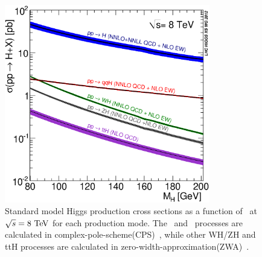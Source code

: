 \begin{figure}[t]
\centering
\includegraphics[width=0.8\textwidth]{figures/Higgs_XS_8TeV_LM200.eps}
\caption{ Standard model Higgs production cross sections 
as a function of \mHi\ at $\sqrt{s}=8~\mathrm{Te\kern -0.1em V}$ for each 
production mode. %
The \ggH\ and \qqH\ processes are 
calculated in complex-pole-scheme(CPS)~\cite{Goria:2011wa}, while other WH/ZH and ttH processes 
are calculated in zero-width-approximation(ZWA)~\cite{pilkuhn1967interactions}. }
\label{fig:Higgs_XS_8TeV_LM200}
\end{figure}

